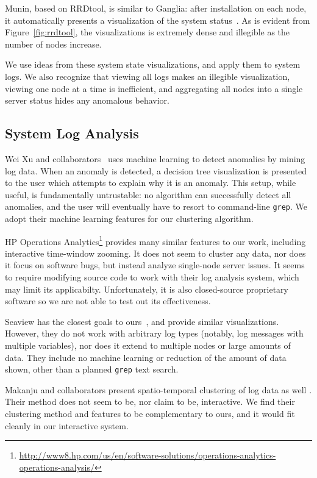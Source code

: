 \documentclass[conference]{style/acmsiggraph}
\begin{document}
Munin, based on RRDtool, is similar to Ganglia: after installation on each node, it automatically presents a visualization of the system status~\cite{Oetiker99}.
As is evident from Figure~\ref{fig:rrdtool}, the visualizations is extremely dense and illegible as the number of nodes increase.

We use ideas from these system state visualizations, and apply them to system logs.
We also recognize that viewing all logs makes an illegible visualization, viewing one node at a time is inefficient, and aggregating all nodes into a single server status hides any anomalous behavior.

\subsection{System Log Analysis}

Wei Xu and collaborators~\cite{Xu09} uses machine learning to detect anomalies by mining log data.
When an anomaly is detected, a decision tree visualization is presented to the user which attempts to explain why it is an anomaly.
This setup, while useful, is fundamentally untrustable: no algorithm can successfully detect all anomalies, and the user will eventually have to resort to command-line \texttt{grep}.
We adopt their machine learning features for our clustering algorithm.

HP Operations Analytics\footnote{\url{http://www8.hp.com/us/en/software-solutions/operations-analytics-operations-analysis/}} provides many similar features to our work, including interactive time-window zooming.
It does not seem to cluster any data, nor does it focus on software bugs, but instead analyze single-node server issues.
It seems to require modifying source code to work with their log analysis system, which may limit its applicabilty.
Unfortunately, it is also closed-source proprietary software so we are not able to test out its effectiveness.

Seaview has the closest goals to ours~\cite{hangalseaview}, and provide similar visualizations.
However, they do not work with arbitrary log types (notably, log messages with multiple variables), nor does it extend to multiple nodes or large amounts of data.
They include no machine learning or reduction of the amount of data shown, other than a planned \texttt{grep} text search.

Makanju and collaborators present spatio-temporal clustering of log data as well \cite{makanju2012spatio}.
Their method does not seem to be, nor claim to be, interactive.
We find their clustering method and features to be complementary to ours, and it would fit cleanly in our interactive system.
\end{document}
